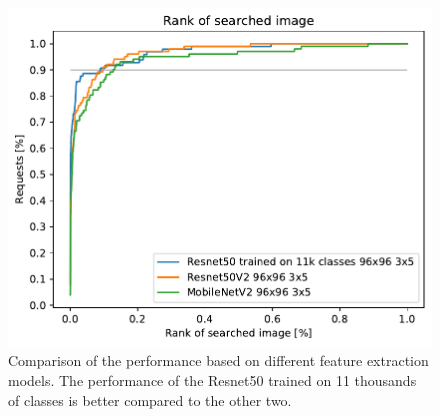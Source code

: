 \begin{figure}
    \centering
    \includegraphics[width=0.8\linewidth]{graphs/2536f6c96149dea24dae84dbf52f760d7d58b0dffa7d660656e1784d9dca277f.pdf}
    \caption{Comparison of the performance based on different feature extraction models. The performance of the Resnet50 trained on 11 thousands of classes is better compared to the other two.}
    \label{fig:networks}
\end{figure}





